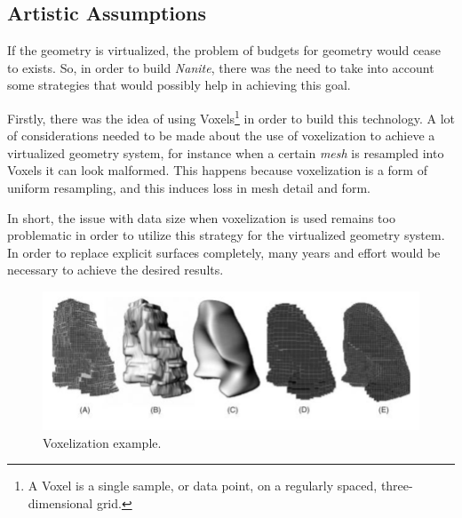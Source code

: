 \documentclass[10pt,journal,compsoc]{IEEEtran}
\begin{document}

\subsection{Artistic Assumptions}

\par If the geometry is virtualized, the problem of budgets for geometry would cease to exists. So, in order to build \textit{Nanite}, there was the need to take into account some strategies that would possibly help in achieving this goal. 

\par Firstly, there was the idea of using Voxels\footnote{A Voxel is a single sample, or data point, on a regularly spaced, three-dimensional grid. } in order to build this technology. A lot of considerations needed to be made about the use of voxelization to achieve a virtualized geometry system, for instance when a certain \textit{mesh} is resampled into Voxels it can look malformed. This happens because voxelization is a form of uniform resampling, and this induces loss in mesh detail and form.

\par In short, the issue with data size when voxelization is used remains too problematic in order to utilize this strategy for the virtualized geometry system. In order to replace explicit surfaces completely, many years and effort would be necessary to achieve the desired results\cite{karies_stubbe_wihlidal_00}. 

\begin{figure}[H]
    \centering
    \includegraphics[scale=0.8]{img/Voxels.png}
    \caption{Voxelization example\cite{voxl}.}
    \label{fig:voxels}
\end{figure}
\end{document}
